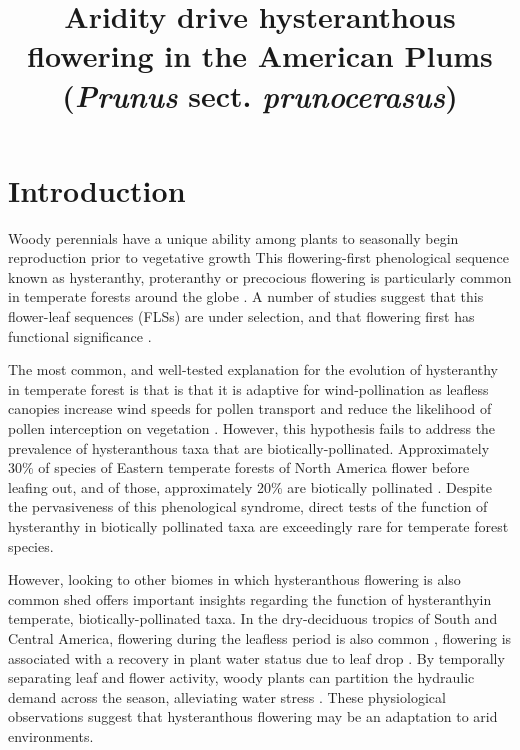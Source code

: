 \documentclass{article}\usepackage[]{graphicx}\usepackage[]{color}
\title{Aridity drive hysteranthous flowering in the American Plums (\textit{Prunus} sect. \textit{prunocerasus})}
\begin{document}
\maketitle


\section*{Introduction}

\noindent Woody perennials have a unique ability among plants to seasonally begin reproduction prior to vegetative growth This flowering-first phenological sequence known as hysteranthy, proteranthy or precocious flowering is particularly common in temperate forests around the globe \citep{Rathcke_1985}. A number of studies suggest that this flower-leaf sequences (FLSs) are under selection, and that flowering first has functional significance \citep{Gougherty2018,Buonaiuto2020,Guo2014}.

\noindent The most common, and well-tested explanation for the evolution of hysteranthy in temperate forest is that is that it is adaptive for wind-pollination as leafless canopies increase wind speeds for pollen transport and reduce the likelihood of pollen interception on vegetation \citep{Whitehead1969,Niklas1985}. However, this hypothesis fails to address the prevalence of hysteranthous taxa that are biotically-pollinated. Approximately 30\% of species of Eastern temperate forests of North America flower before leafing out, and of those, approximately 20\% are biotically pollinated  \citep{Buonaiuto2020}. Despite the pervasiveness of this phenological syndrome, direct tests of the function of hysteranthy in biotically pollinated taxa are exceedingly rare for temperate forest species.

However, looking to other biomes in which hysteranthous flowering is also common shed offers important insights regarding the function of hysteranthyin temperate, biotically-pollinated taxa. In the dry-deciduous tropics of South and Central America, flowering during the leafless period is also common \citep{Rathcke_1985,Franklin2016}, flowering is associated with a recovery in plant water status due to leaf drop \citep{Borchert1983,Reich1984}. By temporally separating leaf and flower activity, woody plants can partition the hydraulic demand across the season, alleviating water stress \citep{Gougherty2018,Franklin2016}. These physiological observations suggest that hysteranthous flowering may be an adaptation to arid environments.
\end{document}
